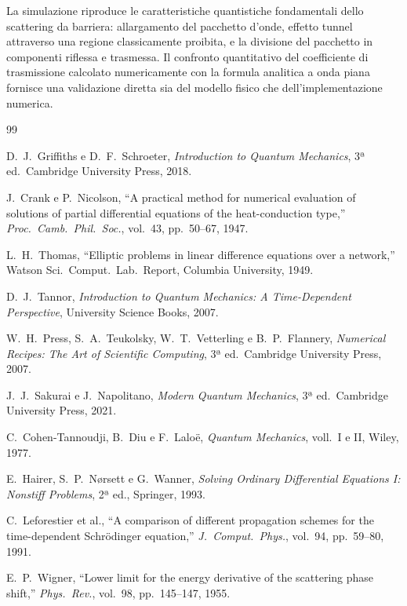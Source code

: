 \documentclass[12pt, a4paper]{article}
\begin{document}
La simulazione riproduce le caratteristiche quantistiche fondamentali dello
scattering da barriera: allargamento del pacchetto d'onde, effetto tunnel
attraverso una regione classicamente proibita, e la divisione del pacchetto
in componenti riflessa e trasmessa. Il confronto quantitativo del coefficiente
di trasmissione calcolato numericamente con la formula analitica a onda piana
fornisce una validazione diretta sia del modello fisico che dell'implementazione
numerica.

\clearpage

\begin{thebibliography}{99}

D.~J.~Griffiths e D.~F.~Schroeter,
\textit{Introduction to Quantum Mechanics}, 3ª ed.\
Cambridge University Press, 2018.

J.~Crank e P.~Nicolson,
``A practical method for numerical evaluation of solutions of partial
differential equations of the heat-conduction type,''
\textit{Proc.\ Camb.\ Phil.\ Soc.}, vol.~43, pp.~50--67, 1947.

L.~H.~Thomas,
``Elliptic problems in linear difference equations over a network,''
Watson Sci.\ Comput.\ Lab.\ Report, Columbia University, 1949.

D.~J.~Tannor,
\textit{Introduction to Quantum Mechanics: A Time-Dependent Perspective},
University Science Books, 2007.

W.~H.~Press, S.~A.~Teukolsky, W.~T.~Vetterling e B.~P.~Flannery,
\textit{Numerical Recipes: The Art of Scientific Computing}, 3ª ed.\
Cambridge University Press, 2007.

J.~J.~Sakurai e J.~Napolitano,
\textit{Modern Quantum Mechanics}, 3ª ed.\
Cambridge University Press, 2021.

\bibitem{Cohen1977}
C.~Cohen-Tannoudji, B.~Diu e F.~Lalo\"{e},
\textit{Quantum Mechanics}, voll.~I e II,
Wiley, 1977.

E.~Hairer, S.~P.~N\o rsett e G.~Wanner,
\textit{Solving Ordinary Differential Equations I: Nonstiff Problems},
2ª ed., Springer, 1993.

\bibitem{Leforestier1991}
C.~Leforestier et al.,
``A comparison of different propagation schemes for the time-dependent
Schr\"{o}dinger equation,''
\textit{J.\ Comput.\ Phys.}, vol.~94, pp.~59--80, 1991.

\bibitem{Wigner1955}
E.~P.~Wigner,
``Lower limit for the energy derivative of the scattering phase shift,''
\textit{Phys.\ Rev.}, vol.~98, pp.~145--147, 1955.

\end{thebibliography}
\end{document}
